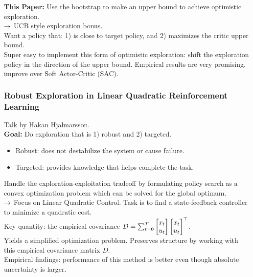 {\bf This Paper:} Use the bootstrap to make an upper bound to achieve optimistic exploration. \\

$\rightarrow$ UCB style exploration bonus. \\

Want a policy that: 1) is close to target policy, and 2) maximizes the critic upper bound. \\

Super easy to implement this form of optimistic exploration: shift the exploration policy in the direction of the upper bound. Empirical results are very promising, improve over Soft Actor-Critic (SAC). 

\subsubsection{Robust Exploration in Linear Quadratic Reinforcement Learning}

Talk by Hakan Hjalmarsson. \\

{\bf Goal:} Do exploration that is 1) robust and 2) targeted.
\begin{itemize}
    \item Robust: does not destabilize the system or cause failure.
    \item Targeted: provides knowledge that helps complete the task.
\end{itemize}

Handle the exploration-exploitation tradeoff by formulating policy search as a convex optimization problem which can be solved for the global optimum. \\

$\rightarrow$ Focus on Linear Quadratic Control. Task is to find a state-feedback controller to minimize a quadratic cost. \\

Key quantity: the empirical covariance $D = \sum_{t=0}^T \begin{bmatrix}x_t \\ u_t\end{bmatrix} \begin{bmatrix}x_t \\ u_t\end{bmatrix}^\top$. \\

Yields a simplified optimization problem. Preserves structure by working with this empirical covariance matrix $D$. \\

Empirical findings: performance of this method is better even though absolute uncertainty is larger. \\

